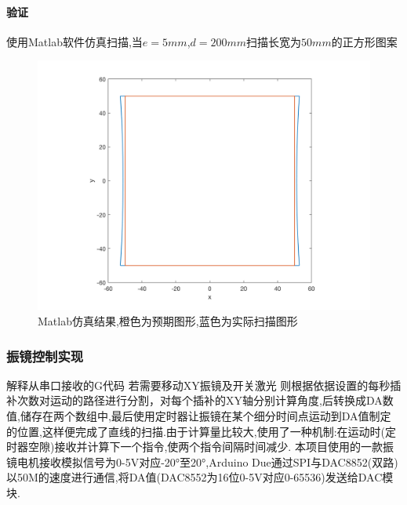 \documentclass[a4paper,12pt,onecolumn,twoside]{article}
\begin{document}
\paragraph{验证}
使用Matlab软件仿真扫描,当$e=5mm$,$d=200mm$扫描长宽为$50mm$的正方形图案\\
\begin{figure}[h]
\centering
\includegraphics[width=\linewidth]{MG7.png}
\caption{Matlab仿真结果,橙色为预期图形,蓝色为实际扫描图形}
\end{figure}
\subsubsection{振镜控制实现}
解释从串口接收的G代码 若需要移动XY振镜及开关激光 则根据依据设置的每秒插补次数对运动的路径进行分割，对每个插补的XY轴分别计算角度,后转换成DA数值,储存在两个数组中,最后使用定时器让振镜在某个细分时间点运动到DA值制定的位置,这样便完成了直线的扫描.由于计算量比较大,使用了一种机制:在运动时(定时器空隙)接收并计算下一个指令,使两个指令间隔时间减少.
本项目使用的一款振镜电机接收模拟信号为0-5V对应-20°至20°,Arduino Due通过SPI与DAC8852(双路)以50M的速度进行通信,将DA值(DAC8552为16位0-5V对应0-65536)发送给DAC模块.
\end{document}
